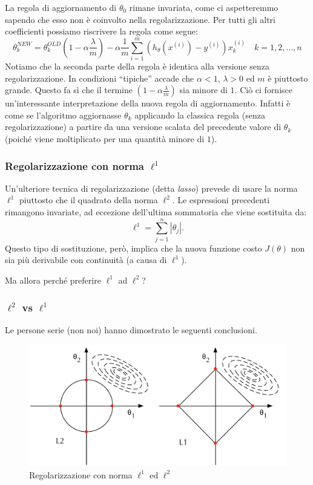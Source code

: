 La regola di aggiornamento di $\theta_0$ rimane invariata, come ci aspetteremmo sapendo che esso non è coinvolto nella regolarizzazione. Per tutti gli altri coefficienti possiamo riscrivere la regola come segue:
\begin{equation*}
\displaystyle\theta^{NEW}_k = \theta^{OLD}_k \left(1- \alpha\frac{\lambda}{m}\right) - \alpha \frac{1}{m} \sum_{i=1}^m \left(h_\theta(x^{(i)}) - y^{(i)}\right)x_k^{(i)} \quad k=1,2,\dots,n
\end{equation*}
Notiamo che la seconda parte della regola è identica alla versione senza regolarizzazione. In condizioni ``tipiche'' accade che $\alpha<1$, $\lambda > 0$ ed $m$ è piuttosto grande. Questo fa sì che il termine $\left(1- \alpha\frac{\lambda}{m}\right)$ sia minore di $1$. Ciò ci fornisce un'interessante interpretazione della nuova regola di aggiornamento. Infatti è come se l'algoritmo aggiornasse $\theta_k$ applicando la classica regola (senza regolarizzazione) a partire da una versione scalata del precedente valore di $\theta_k$ (poiché viene moltiplicato per una quantità minore di $1$).

\subsubsection{Regolarizzazione con norma $\ell^1$}
Un'ulteriore tecnica di regolarizzazione (detta \emph{lasso}) prevede di usare la norma $\ell^1$ piuttosto che il quadrato della norma $\ell^2$. 
Le espressioni precedenti rimangono invariate, ad eccezione dell'ultima sommatoria che viene sostituita da:
\begin{equation*}
\ell^1 = \sum_{j=1}^n|\theta_j|.
\end{equation*}
Questo tipo di sostituzione, però, implica che la nuova funzione costo $J(\theta)$ non sia più derivabile con continuità (a causa di $\ell^1$). 

Ma allora perché preferire $\ell^1$ ad $\ell^2$?

\subsubsection{$\ell^2$ vs $\ell^1$}
Le persone serie (non noi) hanno dimostrato le seguenti conclusioni.

\begin{figure}[]
\centering
  \includegraphics[width=\columnwidth]{images/norme}
  \caption{Regolarizzazione con norma $\ell^1$ ed $\ell^2$}
  \label{fig:norme}
\end{figure}

